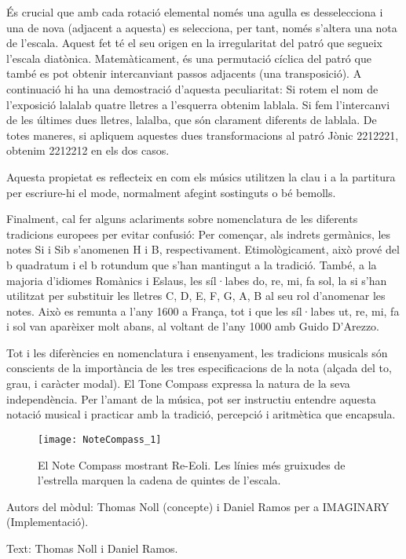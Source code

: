 És crucial que amb cada rotació elemental només una agulla es desselecciona i una de nova (adjacent a aquesta) es selecciona, per tant, només s'altera una nota de l'escala. Aquest fet té el seu origen en la irregularitat del patró que segueix l'escala diatònica. Matemàticament, és una permutació cíclica del patró que també es pot obtenir intercanviant passos adjacents (una transposició). A continuació hi ha una demostració d'aquesta peculiaritat: Si rotem el nom de l'exposició lalalab quatre lletres a l'esquerra obtenim  lablala. Si fem l'intercanvi de les últimes dues lletres, lalalba, que són clarament diferents de lablala. De totes maneres, si apliquem aquestes dues transformacions al patró Jònic 2212221, obtenim 2212212 en els dos casos.

Aquesta propietat es reflecteix en com els músics utilitzen la clau i a la partitura per escriure-hi el mode, normalment afegint sostinguts o bé bemolls.

Finalment, cal fer alguns aclariments sobre nomenclatura de les diferents tradicions europees per evitar confusió: Per començar, als indrets germànics, les notes Si i Sib s'anomenen H i B, respectivament. Etimològicament, això prové del b quadratum i el b rotundum que s'han mantingut a la tradició. També, a la majoria d'idiomes Romànics i Eslaus, les síl·labes do, re, mi, fa sol, la si s'han utilitzat per substituir les lletres C, D, E, F, G, A, B al seu rol d'anomenar les notes. Això es remunta a l'any 1600 a França, tot i que les síl·labes ut, re, mi, fa i sol van aparèixer molt abans, al voltant de l'any 1000 amb Guido D'Arezzo.


Tot i les diferències en nomenclatura i ensenyament, les tradicions musicals són conscients de la importància de les tres especificacions de la nota (alçada del to, grau, i caràcter modal). El Tone Compass expressa la natura de la seva independència. Per l'amant de la música, pot ser instructiu entendre aquesta notació musical i practicar amb la tradició, percepció i aritmètica que encapsula.


\begin{figure}[hp]
\centering
\texttt{[image: NoteCompass\_1]}
\caption*{El Note Compass mostrant Re-Eoli. Les línies més gruixudes de l'estrella marquen la cadena de quintes de l'escala.}
\end{figure}


\begin{sectcredits}
\item[Autors del mòdul:] Thomas Noll (concepte) i Daniel Ramos per a IMAGINARY (Implementació).
\item[Text:] Thomas Noll i Daniel Ramos.
\end{sectcredits}
